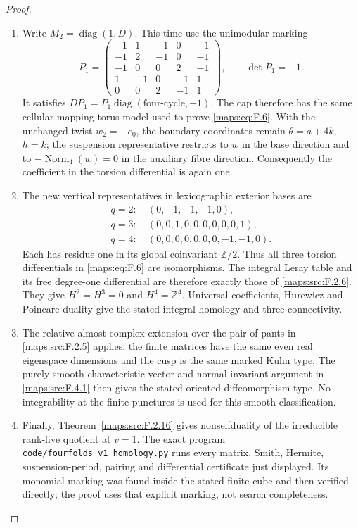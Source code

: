 \begin{proof}
\begin{enumerate}[label=\arabic*.]
\item Write $M_2=\operatorname{diag}(1,D)$.  This time use the
unimodular marking
\[
 P_1=\begin{pmatrix}
 -1&1&-1&0&-1\\
 -1&2&-1&0&-1\\
 -1&0&0&2&-1\\
 1&-1&0&-1&1\\
 0&0&2&-1&1
 \end{pmatrix},\qquad \det P_1=-1.
\]
It satisfies $DP_1=P_1\operatorname{diag}(\text{four-cycle},-1)$.
The cap therefore has the same cellular mapping-torus model
used to prove \eqref{maps:eq:F.6}.  With the unchanged twist $w_2=-e_0$,
the boundary coordinates remain $\theta=a+4k$, $h=k$;
the suspension representative restricts to $w$ in the base
direction and to $-\operatorname{Norm}_4(w)=0$ in the
auxiliary fibre direction.  Consequently the coefficient in
the torsion differential is again one.

\item The new vertical representatives in lexicographic exterior
bases are
\[
\begin{split}
 q=2:\ &(0,-1,-1,-1,0),\\
 q=3:\ &(0,0,1,0,0,0,0,0,0,1),\\
 q=4:\ &(0,0,0,0,0,0,0,-1,-1,0).
\end{split}
\]
Each has residue one in its global coinvariant
$\mathbb Z/2$.  Thus all three torsion differentials in \eqref{maps:eq:F.6}
are isomorphisms.  The integral Leray table and its free
degree-one differential are therefore exactly those of
\ref{maps:src:F.2.6}.  They give $H^2=H^3=0$ and $H^4=\mathbb Z^4$.
Universal coefficients, Hurewicz and Poincare duality give
the stated integral homology and three-connectivity.

\item The relative almost-complex extension over the pair of pants
in \ref{maps:src:F.2.5} applies: the finite matrices have the same even
real eigenspace dimensions and the cusp is the same marked
Kuhn type.  The purely smooth characteristic-vector and
normal-invariant argument in \ref{maps:src:F.4.1} then gives the stated
oriented diffeomorphism type.  No integrability at the finite
punctures is used for this smooth classification.

\item Finally, Theorem~\ref{maps:src:F.2.16} gives nonselfduality of the irreducible rank-five quotient at $v=1$.
The exact program
\texttt{code/fourfolds\_v1\_homology.py} runs every matrix,
Smith, Hermite, suspension-period, pairing and differential
certificate just displayed.  Its monomial marking was found
inside the stated finite cube and then verified directly;
the proof uses that explicit marking, not search completeness.

\end{enumerate}
\end{proof}




